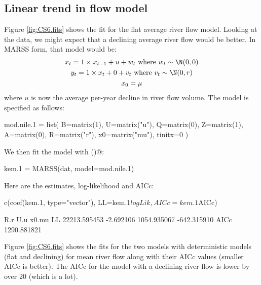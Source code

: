 \subsection{Linear trend in flow model}
Figure \ref{fig:CS6.fits} shows the fit for the flat average river flow model.  Looking at the data, we might expect that a declining average river flow would be better.  In MARSS form, that model would be:
\begin{equation}
\begin{gathered}
x_t = 1 \times x_{t-1}+ u + w_t    \text{ where } w_t \sim \N(0,0) \\
y_t = 1 \times x_t + 0 + v_t \text{ where } v_t \sim \N(0,r)  \\
x_0 = \mu
\end{gathered}   
\label{eq:marss.model.1}\end{equation}
where $u$ is now the average per-year decline in river flow volume.  The model is specified  as follows:
\begin{Schunk}
\begin{Sinput}
 mod.nile.1 = list(
 B=matrix(1), U=matrix("u"), Q=matrix(0),
 Z=matrix(1), A=matrix(0), R=matrix("r"),
 x0=matrix("mu"), tinitx=0 )
\end{Sinput}
\end{Schunk}

We then fit the model with \verb@MARSS()@:
\begin{Schunk}
\begin{Sinput}
 kem.1 = MARSS(dat, model=mod.nile.1)
\end{Sinput}
\end{Schunk}
Here are the estimates, log-likelihood and AICc:
\begin{Schunk}
\begin{Sinput}
 c(coef(kem.1, type="vector"), LL=kem.1$logLik, AICc=kem.1$AICc)
\end{Sinput}
\begin{Soutput}
         R.r          U.u        x0.mu           LL 
22213.595453    -2.692106  1054.935067  -642.315910 
        AICc 
 1290.881821 
\end{Soutput}
\end{Schunk}
Figure \ref{fig:CS6.fits} shows the fits for the two models with deterministic models (flat and declining) for mean river flow along with their AICc values (smaller AICc is better).    The AICc for the model with a declining river flow is lower by over 20 (which is a lot).

